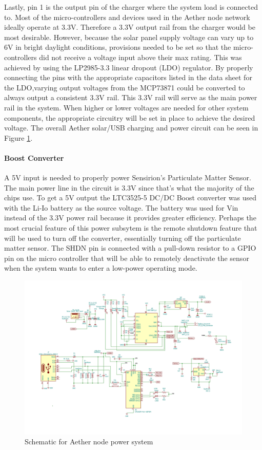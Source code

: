 Lastly, pin 1 is the output pin of the charger where the system load is connected to. Most of the micro-controllers and devices used in the Aether node network ideally operate at 3.3V. Therefore a 3.3V output rail from the charger would be most desirable. However, because the solar panel supply voltage can vary up to 6V in bright daylight conditions, provisions needed to be set so that the micro-controllers did not receive a voltage input above their max rating. This was achieved by using the LP2985-3.3 linear dropout (LDO) regulator. By properly connecting the pins with the appropriate capacitors listed in the data sheet for the LDO,varying output voltages from the MCP73871 could be converted to always output a consistent 3.3V rail. This 3.3V rail will serve as the main power rail in the system. When higher or lower voltages are needed for other system components, the appropriate circuitry will be set in place to achieve the desired voltage. The overall Aether solar/USB charging and power circuit can be seen in Figure \ref{fig:power_schematic}.

\paragraph{Boost Converter}
A 5V input is needed to properly power Sensirion's Particulate Matter Sensor. The main power line in the circuit is 3.3V since that's what the majority of the chips use. To get a 5V output the LTC3525-5 DC/DC Boost converter was used with the Li-Io battery as the source voltage. The battery was used for Vin instead of the 3.3V power rail because it provides greater efficiency. Perhaps the most crucial feature of this power subsytem is the remote shutdown feature that will be used to turn off the converter, essentially turning off the particulate matter sensor. The SHDN pin is connected with a pull-down resistor to a GPIO pin on the micro controller that will be able to remotely deactivate the sensor when the system wants to enter a low-power operating mode. 

\begin{figure}
    \centering
    \includegraphics[scale=1.0]{figures/Power Schematic.jpg}
    \caption{Schematic for Aether node power system}
    \label{fig:power_schematic} 
\end{figure}
